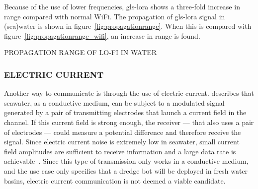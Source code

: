Because of the use of lower frequencies, \gls{gls-lora} shows a three-fold increase in range compared with normal 
WiFi. The propagation of \gls{gls-lora} signal in (sea)water is shown in figure~\ref{fig:propagationrange}.
When this is compared with figure~\ref{fig:propagationrange_wifi}, an increase in range is found.

\begin{RoyalFigure}[!htb, label=fig:propagationrange]{PROPAGATION RANGE OF LO-FI IN WATER}
\end{RoyalFigure}

\subsubsection{ELECTRIC CURRENT}\label{sec:ec}
Another way to communicate is through the use of electric current. \citet{hagman_elias_design_2009} describes that 
seawater, as a conductive medium, can be subject to a modulated signal generated by a pair of transmitting electrodes
that launch a current field in the channel. If this current field is strong enough, the receiver --- that also uses a
pair of electrodes --- could measure a potential difference and therefore receive the signal. Since electric current 
noise is extremely low in seawater, small current field amplitudes are sufficient to receive information and a large 
data rate is achievable~\cite{hagman_elias_design_2009}. Since this type of transmission only works in a conductive 
medium, and the use case only specifies that a dredge bot will be deployed in fresh water basins, electric current 
communication is not deemed a viable candidate.

